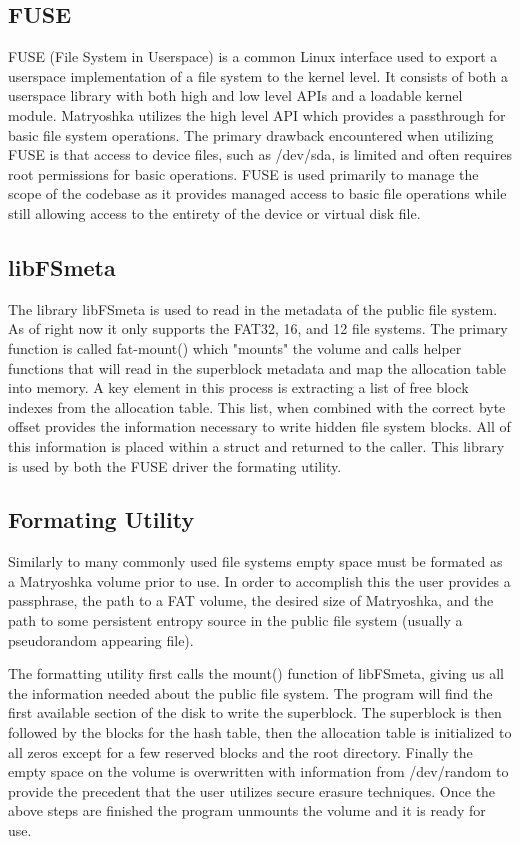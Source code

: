 \documentclass{article}
\begin{document}
\begin{multicols}{2}
\subsection{FUSE}
FUSE (File System in Userspace) is a common Linux interface used to export a userspace implementation of a file system to the kernel level. It consists of both a userspace library with both high and low level APIs and a loadable kernel module. Matryoshka utilizes the high level API which provides a passthrough for basic file system operations. The primary drawback encountered when utilizing FUSE is that access to device files, such as /dev/sda, is limited and often requires root permissions for basic operations. FUSE is used primarily to manage the scope of the codebase as it provides managed access to basic file operations while still allowing access to the entirety of the device or virtual disk file.

\subsection{libFSmeta}

The library libFSmeta is used to read in the metadata of the public file system. As of right now it only supports the FAT32, 16, and 12 file systems. The primary function is called fat-mount() which "mounts" the volume and calls helper functions that will read in the superblock metadata and map the allocation table into memory. A key element in this process is extracting a list of free block indexes from the allocation table. This list, when combined with the correct byte offset provides the information necessary to write hidden file system blocks. All of this information is placed within a struct and returned to the caller. This library is used by both the FUSE driver the formating utility.

\subsection{Formating Utility}
Similarly to many commonly used file systems empty space must be formated as a Matryoshka volume prior to use. In order to accomplish this the user provides a passphrase, the path to a FAT volume, the desired size of Matryoshka, and the path to some persistent entropy source in the public file system (usually a pseudorandom appearing file). 

The formatting utility first calls the mount() function of libFSmeta, giving us all the information needed about the public file system. The program will find the first available section of the disk to write the superblock. The superblock is then followed by the blocks for the hash table, then the allocation table is initialized to all zeros except for a few reserved blocks and the root directory. Finally the empty space on the volume is overwritten with information from /dev/random to provide the precedent that the user utilizes secure erasure techniques. Once the above steps are finished the program unmounts the volume and it is ready for use.


\end{multicols}
\end{document}
